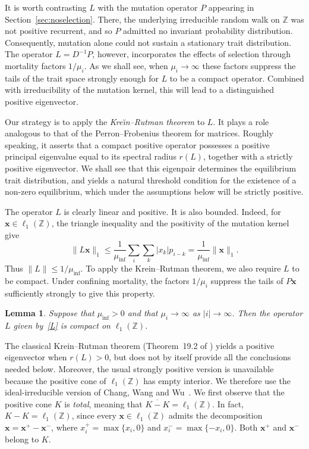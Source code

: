 \documentclass[12pt]{article}
\newtheorem{lemma}{Lemma}
\newcommand{\Z}{\ensuremath{\mathbb Z}}
\newcommand{\muinf}{\ensuremath{\mu_{\inf}}}
\newcommand{\BS}{\ensuremath{\ell_1(\Z)}}
\newcommand{\bx}{\boldsymbol{x}}
\begin{document}
It is worth contrasting $L$ with the mutation operator $P$ appearing in
Section~\ref{sec:noselection}. There, the underlying irreducible random
walk on $\Z$ was not positive recurrent, and so $P$ admitted no
invariant probability distribution. Consequently, mutation alone could
not sustain a stationary trait distribution. The operator $L=D^{-1}P$,
however, incorporates the effects of selection through mortality factors
$1/\mu_i$. As we shall see, when $\mu_i\to\infty$ these factors suppress 
the tails of
the trait space strongly enough for $L$ to be a compact operator. Combined
with irreducibility of the mutation kernel, this will lead to a
distinguished positive eigenvector.

Our strategy is to apply the {\em Kre\u{\i}n--Rutman theorem\/} to $L$.
It plays a role analogous to that of the Perron--Frobenius theorem for
matrices. Roughly speaking, it asserts that a compact positive operator
possesses a positive principal eigenvalue equal to its spectral radius
$r(L)$, together with a strictly positive eigenvector. We shall see that
this eigenpair determines the equilibrium trait distribution, and yields
a natural threshold condition for the existence of a non-zero
equilibrium, which under the assumptions below will be strictly
positive.

The operator $L$ is clearly linear and positive. It is also bounded.
Indeed, for $\bx\in\BS$, the triangle inequality and the positivity of
the mutation kernel give
$$
\|L\bx\|_1 \leq \frac{1}{\muinf}\sum_i\sum_k|x_k|p_{i-k}
= \frac{1}{\muinf}\|\bx\|_1.
$$
Thus $\|L\|\leq1/\muinf$.
To apply the Krein--Rutman theorem, we also require $L$ to be compact.
Under confining mortality, the factors $1/\mu_i$ suppress the tails of
$P\bx$ sufficiently strongly to give this property.

\begin{lemma}
\label{lemma:compact}
Suppose that $\muinf>0$ and that
$\mu_i\to\infty$ as $|i|\to\infty$. Then the operator $L$ given
by~\eqref{L} is compact on $\BS$.
\end{lemma}

The classical Krein--Rutman theorem (Theorem~19.2 of \cite{Dei85})
yields a positive eigenvector when $r(L)>0$, but does not by itself
provide all the conclusions needed below. Moreover, the usual strongly
positive version is unavailable because the positive cone of $\BS$ has
empty interior. We therefore use the ideal-irreducible version of Chang,
Wang and Wu~\cite{CWW20}.
We first observe that the positive cone $K$ is {\em total\/},
meaning that $\overline{K-K}=\BS$. In fact, $K-K=\BS$, since every
$\bx\in\BS$ admits the decomposition $\bx=\bx^+-\bx^-$, where
$x_i^+=\max\{x_i,0\}$ and $x_i^-=\max\{-x_i,0\}$. Both $\bx^+$ and
$\bx^-$ belong to $K$.
\end{document}
